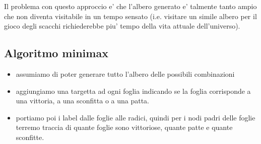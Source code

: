 \documentclass{article}
\begin{document}
Il problema con questo approccio e' che l'albero generato e' talmente tanto ampio
che non diventa visitabile in un tempo sensato (i.e. visitare un simile albero per
il gioco degli scacchi richiederebbe piu' tempo della vita attuale dell'universo).

\subsection{Algoritmo minimax}

\begin{itemize}
  \item assumiamo di poter generare tutto l'albero delle possibili combinazioni
  \item aggiungiamo una targetta ad ogni foglia indicando se la foglia corrisponde
    a una vittoria, a una sconfitta o a una patta.
  \item portiamo poi i label dalle foglie alle radici, quindi per i nodi padri
    delle foglie terremo traccia di quante foglie sono vittoriose, quante patte e quante sconfitte.
\end{itemize}
\end{document}
